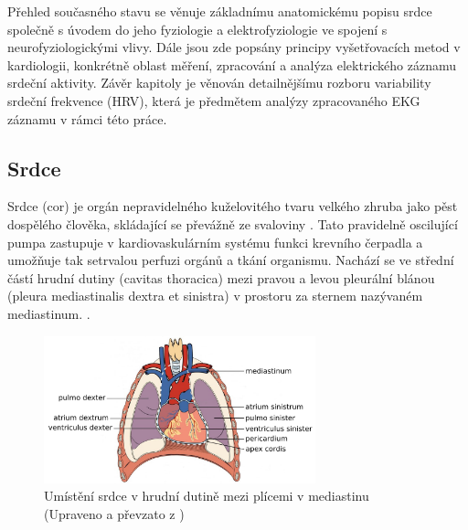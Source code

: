 Přehled současného stavu se věnuje základnímu anatomickému popisu srdce společně
s úvodem do jeho fyziologie a elektrofyziologie ve spojení s neurofyziologickými
vlivy. Dále jsou zde popsány principy vyšetřovacích metod v kardiologii,
konkrétně oblast měření, zpracování a analýza elektrického záznamu srdeční
aktivity. Závěr kapitoly je věnován detailnějšímu rozboru variability srdeční
frekvence (HRV), která je předmětem analýzy zpracovaného EKG záznamu v rámci
této práce.

\subsection{Srdce}
\label{section:heart}
Srdce (cor) je orgán nepravidelného kuželovitého tvaru velkého zhruba jako pěst
dospělého člověka, skládající se převážně ze svaloviny \cite{Memorix2017}. Tato
pravidelně oscilující pumpa zastupuje v kardiovaskulárním systému funkci
krevního čerpadla a umožňuje tak setrvalou perfuzi orgánů a tkání organismu.
Nachází se ve střední částí hrudní dutiny (cavitas thoracica) mezi pravou a
levou pleurální blánou (pleura mediastinalis dextra et sinistra) v prostoru za
sternem nazývaném mediastinum. \cite{Weinhaus2005}.

\begin{figure}[h]
	\begin{center}
		\includegraphics[width=0.7\textwidth]{../assets/anatomy/mediastinum}
		\caption{Umístění srdce v hrudní dutině mezi plícemi v mediastinu
			(Upraveno a převzato z \cite{OpenStax})}
		\label{fig:mediastinum}
	\end{center}
\end{figure}

